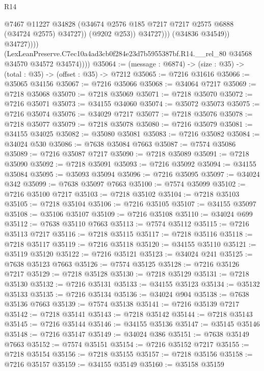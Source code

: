 \begin{lexlean}{R14}
\begin{coremodule}
                              @7467
                              @11227
                              @34828
                              (@34674 @2576 @185 @7217 @7217 @2575 @6888 (@34724 @2575) @34727))
                            (@9202 @253))
                          @34727)))
                    (@34836 @34549))
                  @34727))))
          (LexLeanPreserve.C7ec10a4ad3cb0f284e23d7b5955387bf.R14.__rel_80
            @34568
            @34570
            @34572
            @34574))))
@35064 := (message : @6874) -> (size : @35) -> (total : @35) -> (offset : @35) -> @7212
@35065 := @7216 @31616
@35066 := @35065 @34156
@35067 := @7216 @35066
@35068 := @34064 @7217
@35069 := @7218 @35068
@35070 := @7218 @35069
@35071 := @7218 @35070
@35072 := @7216 @35071
@35073 := @34155 @34060
@35074 := @35072 @35073
@35075 := @7216 @35074
@35076 := @34029 @7217
@35077 := @7218 @35076
@35078 := @7218 @35077
@35079 := @7218 @35078
@35080 := @7216 @35079
@35081 := @34155 @34025
@35082 := @35080 @35081
@35083 := @7216 @35082
@35084 := @34024 @530
@35086 := @7638 @35084 @7663
@35087 := @7574 @35086
@35089 := @7216 @35087 @7217
@35090 := @7218 @35089
@35091 := @7218 @35090
@35092 := @7218 @35091
@35093 := @7216 @35092
@35094 := @34155 @35084
@35095 := @35093 @35094
@35096 := @7216 @35095
@35097 := @34024 @342
@35099 := @7638 @35097 @7663
@35100 := @7574 @35099
@35102 := @7216 @35100 @7217
@35103 := @7218 @35102
@35104 := @7218 @35103
@35105 := @7218 @35104
@35106 := @7216 @35105
@35107 := @34155 @35097
@35108 := @35106 @35107
@35109 := @7216 @35108
@35110 := @34024 @699
@35112 := @7638 @35110 @7663
@35113 := @7574 @35112
@35115 := @7216 @35113 @7217
@35116 := @7218 @35115
@35117 := @7218 @35116
@35118 := @7218 @35117
@35119 := @7216 @35118
@35120 := @34155 @35110
@35121 := @35119 @35120
@35122 := @7216 @35121
@35123 := @34024 @241
@35125 := @7638 @35123 @7663
@35126 := @7574 @35125
@35128 := @7216 @35126 @7217
@35129 := @7218 @35128
@35130 := @7218 @35129
@35131 := @7218 @35130
@35132 := @7216 @35131
@35133 := @34155 @35123
@35134 := @35132 @35133
@35135 := @7216 @35134
@35136 := @34024 @904
@35138 := @7638 @35136 @7663
@35139 := @7574 @35138
@35141 := @7216 @35139 @7217
@35142 := @7218 @35141
@35143 := @7218 @35142
@35144 := @7218 @35143
@35145 := @7216 @35144
@35146 := @34155 @35136
@35147 := @35145 @35146
@35148 := @7216 @35147
@35149 := @34024 @386
@35151 := @7638 @35149 @7663
@35152 := @7574 @35151
@35154 := @7216 @35152 @7217
@35155 := @7218 @35154
@35156 := @7218 @35155
@35157 := @7218 @35156
@35158 := @7216 @35157
@35159 := @34155 @35149
@35160 := @35158 @35159

\end{coremodule}
\end{lexlean}
